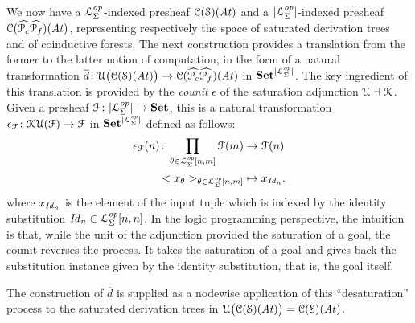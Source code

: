 We now have a $\mathcal{L}^{\mathit{op}}_{\Sigma}$-indexed presheaf $\mathcal{C}(\mathcal{S})(\mathit{At})$ and a $|\mathcal{L}^{\mathit{op}}_{\Sigma}|$-indexed presheaf $\mathcal{C}(\widehat{\mathcal P _c}\widehat{\mathcal P _f})(\mathit{At})$, representing respectively the space of saturated derivation trees and of coinductive forests. The next construction provides a translation from the former to the latter notion of computation, in the form of a natural transformation $\overline{d} \colon \mathcal{U} \big( \mathcal{C}(\mathcal{S})(\mathit{At})\big) \to \mathcal{C}(\widehat{\mathcal P _c}\widehat{\mathcal P _f})(\mathit{At})$ in $\mathbf{Set}^{|\mathcal{L}^{\mathit{op}}_{\Sigma}|}$. The key ingredient of this translation is provided by the \emph{counit} $\epsilon$ of the saturation adjunction $\mathcal{U} \dashv \mathcal{K}$. Given a presheaf $\mathcal{F} \colon |\mathcal{L}^{\mathit{op}}_{\Sigma}| \to \mathbf{Set}$, this is a natural transformation $\epsilon_{\mathcal{F}} \colon \mathcal{K}\mathcal{U}(\mathcal{F}) \to \mathcal{F}$ in $\mathbf{Set}^{|\mathcal{L}^{\mathit{op}}_{\Sigma}|}$ defined as follows:
\begin{align*}
  \epsilon_{\mathcal{F}} (n)\colon \prod_{\theta \in \mathcal{L}^{\mathit{op}}_{\Sigma}[n,m]} \mathcal{F} (m)  & \to \mathcal{F}(n) \\
 < x_{\theta} >_{\theta \in \mathcal{L}^{\mathit{op}}_{\Sigma}[n,m]} & \mapsto x_{\mathit{Id}_{n}}.
\end{align*}
where $x_{\mathit{Id}_{n}}$ is the element of the input tuple which is indexed by the identity substitution $\mathit{Id}_{n} \in \mathcal{L}^{\mathit{op}}_{\Sigma}[n,n]$. In the logic programming perspective, the intuition is that, while the unit of the adjunction provided the saturation of a goal, the counit reverses the process. It takes the saturation of a goal and gives back the substitution instance given by the identity substitution, that is, the goal itself.

The construction of $\overline{d}$ is supplied as a nodewise application of this ``desaturation'' process to the saturated derivation trees in $\mathcal{U} \big( \mathcal{C}(\mathcal{S})(\mathit{At})\big) = \mathcal{C}(\mathcal{S})(\mathit{At})$.

